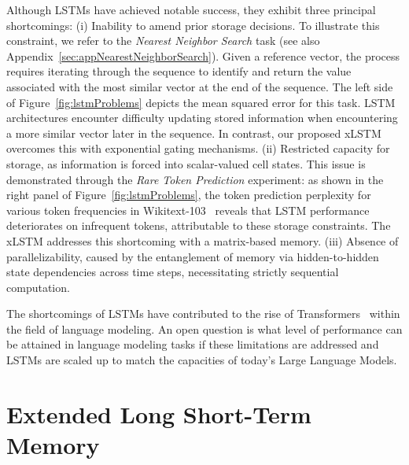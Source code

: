 Although LSTMs have achieved notable success, they exhibit three principal shortcomings: (i) Inability to amend prior storage decisions. To illustrate this constraint, we refer to the {\it Nearest Neighbor Search} task (see also Appendix~\ref{sec:appNearestNeighborSearch}). Given a reference vector, the process requires iterating through the sequence to identify and return the value associated with the most similar vector at the end of the sequence. The left side of Figure~\ref{fig:lstmProblems} depicts the mean squared error for this task. LSTM architectures encounter difficulty updating stored information when encountering a more similar vector later in the sequence. In contrast, our proposed xLSTM overcomes this with exponential gating mechanisms. (ii) Restricted capacity for storage, as information is forced into scalar-valued cell states. This issue is demonstrated through the {\it Rare Token Prediction} experiment: as shown in the right panel of Figure~\ref{fig:lstmProblems}, the token prediction perplexity for various token frequencies in Wikitext-103~\citep{Merity:17} reveals that LSTM performance deteriorates on infrequent tokens, attributable to these storage constraints. The xLSTM addresses this shortcoming with a matrix-based memory. (iii) Absence of parallelizability, caused by the entanglement of memory via hidden-to-hidden state dependencies across time steps, necessitating strictly sequential computation.

The shortcomings of LSTMs have contributed to the rise of Transformers~\citep{Vaswani:17} within the field of language modeling. An open question is what level of performance can be attained in language modeling tasks if these limitations are addressed and LSTMs are scaled up to match the capacities of today’s Large Language Models.

\section{Extended Long Short-Term Memory}
\label{sec:xLSTM}

